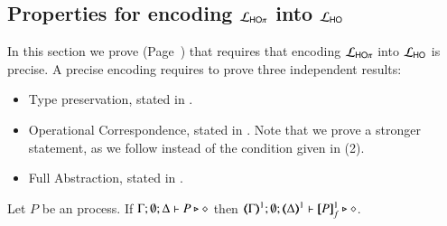 
\subsection{Properties for encoding $\mathcal{L}_{\mathsf{HO}\pi}$ into $\mathcal{L}_{\mathsf{HO}}$}
\label{app:enc_HOp_to_HO}


In this section we prove  (Page~\pageref{f:enc:hopitoho})
that requires that encoding
$\mathcal{L}_{\mathsf{HO}\pi}$ into $\mathcal{L}_{\mathsf{HO}}$ is precise.
A precise encoding requires to prove three independent results:
\begin{itemize}
	\item	Type preservation, stated in .
	\item	Operational Correspondence, stated in .
		Note that we prove a stronger statement,
		as we follow 
		instead of the condition given in (2).
	\item	Full Abstraction, stated in .
\end{itemize}


\begin{proposition}
	\label{app:prop:typepres_HOp_to_HO}
	Let $P$ be an \HOp process.
	If $\Gamma; \emptyset; \Delta \vdash P \triangleright \diamond$ then 
	$\mapt{\Gamma}^{1}; \emptyset; \mapt{\Delta}^{1} \proves \pmapp{P}{1}{f} \hastype \Proc$. 
\end{proposition}

